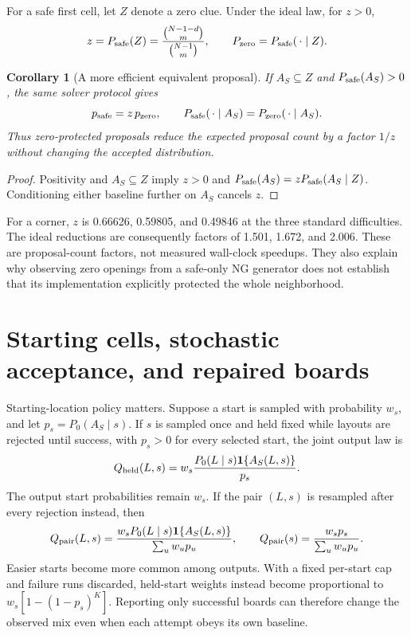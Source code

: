 \documentclass[11pt]{article}
\newtheorem{corollary}[proposition]{Corollary}
\newcommand{\ind}{\mathbf 1}
\begin{document}
For a safe first cell, let $Z$ denote a zero clue. Under the ideal law, for $z>0$,
\begin{equation}
 z=P_{\rm safe}(Z)=\frac{\binom{N-1-d}{m}}{\binom{N-1}{m}},\qquad
 P_{\rm zero}=P_{\rm safe}(\,\cdot\mid Z).
 \label{eq:zero}
\end{equation}
\begin{corollary}[A more efficient equivalent proposal]
If $A_S\subseteq Z$ and $P_{\rm safe}(A_S)>0$, the same solver protocol gives
\begin{equation}
 p_{\rm safe}=z\,p_{\rm zero},\qquad
 P_{\rm safe}(\,\cdot\mid A_S)=P_{\rm zero}(\,\cdot\mid A_S).
 \label{eq:equivalent}
\end{equation}
Thus zero-protected proposals reduce the expected proposal count by a factor $1/z$ without changing the accepted distribution.
\end{corollary}
\begin{proof}
Positivity and $A_S\subseteq Z$ imply $z>0$ and $P_{\rm safe}(A_S)=zP_{\rm safe}(A_S\mid Z)$. Conditioning either baseline further on $A_S$ cancels $z$.
\end{proof}

For a corner, $z$ is 0.66626, 0.59805, and 0.49846 at the three standard difficulties. The ideal reductions are consequently factors of 1.501, 1.672, and 2.006. These are proposal-count factors, not measured wall-clock speedups. They also explain why observing zero openings from a safe-only NG generator does not establish that its implementation explicitly protected the whole neighborhood.

\section{Starting cells, stochastic acceptance, and repaired boards}

Starting-location policy matters. Suppose a start is sampled with probability $w_s$, and let $p_s=P_0(A_S\mid s)$. If $s$ is sampled once and held fixed while layouts are rejected until success, with $p_s>0$ for every selected start, the joint output law is
\begin{equation}
 Q_{\rm held}(L,s)=w_s\frac{P_0(L\mid s)\ind\{A_S(L,s)\}}{p_s}.
 \label{eq:held}
\end{equation}
The output start probabilities remain $w_s$. If the pair $(L,s)$ is resampled after every rejection instead, then
\begin{equation}
 Q_{\rm pair}(L,s)=\frac{w_sP_0(L\mid s)\ind\{A_S(L,s)\}}{\sum_u w_up_u},\qquad
 Q_{\rm pair}(s)=\frac{w_sp_s}{\sum_u w_up_u}.
 \label{eq:pair}
\end{equation}
Easier starts become more common among outputs. With a fixed per-start cap and failure runs discarded, held-start weights instead become proportional to $w_s[1-(1-p_s)^K]$. Reporting only successful boards can therefore change the observed mix even when each attempt obeys its own baseline.
\end{document}
